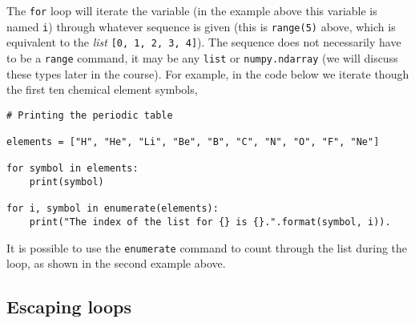 \documentclass[a4paper]{article}
\begin{document}
The \texttt{for} loop will iterate the variable (in the example above this variable is named \texttt{i}) through whatever sequence is given (this is \texttt{range(5)} above, which is equivalent to the \emph{list} \texttt{[0, 1, 2, 3, 4]}). 
The sequence does not necessarily have to be a \texttt{range} command, it may be any \texttt{list} or \texttt{numpy.ndarray} (we will discuss these types later in the course). 
For example, in the code below we iterate though the first ten chemical element symbols, 
\begin{lstlisting}
# Printing the periodic table

elements = ["H", "He", "Li", "Be", "B", "C", "N", "O", "F", "Ne"]

for symbol in elements:
	print(symbol)

for i, symbol in enumerate(elements):
	print("The index of the list for {} is {}.".format(symbol, i)).
\end{lstlisting}
It is possible to use the \texttt{enumerate} command to count through the list during the loop, as shown in the second example above. 
\vspace{\baselineskip}
\begin{center}
	\noindent{}
\end{center}

\subsection{Escaping loops}
\end{document}
